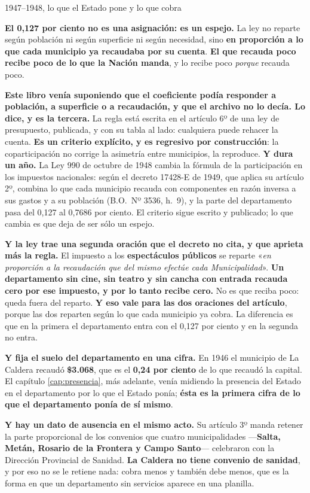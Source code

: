 \begin{ficha}{1947--1948, lo que el Estado pone y lo que cobra}
\begin{cautela}
\textbf{El 0,127 por ciento no es una asignación: es un espejo.} La ley no reparte según
población ni según superficie ni según necesidad, sino \textbf{en proporción a lo que cada
municipio ya recaudaba por su cuenta}. \textbf{El que recauda poco recibe poco de lo que la
Nación manda}, y lo recibe poco \textit{porque} recauda poco.

\textbf{Este libro venía suponiendo que el coeficiente podía responder a población, a
superficie o a recaudación, y que el archivo no lo decía. Lo dice, y es la tercera.} La
regla está escrita en el artículo 6º de una ley de presupuesto, publicada, y con su tabla al
lado: cualquiera puede rehacer la cuenta. \textbf{Es un criterio explícito, y es regresivo por
construcción}: la coparticipación no corrige la asimetría entre municipios, la reproduce.
\textbf{Y dura un año.} La Ley 990 de octubre de 1948 cambia la fórmula de la participación en los
impuestos nacionales: según el decreto 17428-E de 1949, que aplica su artículo 2º, combina lo que
cada municipio recauda con componentes en razón inversa a sus gastos y a su población (B.O.\ Nº 3536,
h.\ 9), y la parte del departamento pasa del 0,127 al 0,7686 por ciento. El criterio sigue escrito y
publicado; lo que cambia es que deja de ser sólo un espejo.

\textbf{Y la ley trae una segunda oración que el decreto no cita, y que aprieta más la
regla.} El impuesto a los \textbf{espectáculos públicos} se reparte «\textit{en proporción a
la recaudación que del mismo efectúe cada Municipalidad}». \textbf{Un departamento sin
cine, sin teatro y sin cancha con entrada recauda cero por ese impuesto, y por lo tanto recibe
cero.} No es que reciba poco: queda fuera del reparto. \textbf{Y eso vale para las dos
oraciones del artículo}, porque las dos reparten según lo que cada municipio ya cobra. La
diferencia es que en la primera el departamento entra con el 0,127 por ciento y en la segunda
no entra.

\textbf{Y fija el suelo del departamento en una cifra.} En 1946 el municipio de La Caldera
recaudó \textbf{\$3.068}, que es el \textbf{0,24 por ciento} de lo que recaudó la capital.
El capítulo \ref{cap:presencia}, más adelante, venía midiendo la presencia del Estado en el departamento por
lo que el Estado ponía; \textbf{ésta es la primera cifra de lo que el departamento ponía de sí
mismo}.

\textbf{Y hay un dato de ausencia en el mismo acto.} Su artículo 3º manda retener la parte
proporcional de los convenios que cuatro municipalidades ---\textbf{Salta, Metán, Rosario de
la Frontera y Campo Santo}--- celebraron con la Dirección Provincial de Sanidad. \textbf{La
Caldera no tiene convenio de sanidad}, y por eso no se le retiene nada: cobra menos y también
debe menos, que es la forma en que un departamento sin servicios aparece en una planilla.
\end{cautela}


\end{ficha}
